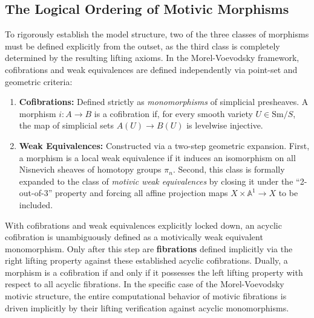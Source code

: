 \documentclass[11pt,oneside]{article}
\begin{document}
\subsection{The Logical Ordering of Motivic Morphisms}
To rigorously establish the model structure, two of the three classes of morphisms must be defined explicitly from the outset, as the third class is completely determined by the resulting lifting axioms. In the Morel-Voevodsky framework, cofibrations and weak equivalences are defined independently via point-set and geometric criteria:
\begin{enumerate}
    \item \textbf{Cofibrations:} Defined strictly as \emph{monomorphisms} of simplicial presheaves. A morphism $i: A \to B$ is a cofibration if, for every smooth variety $U \in \text{Sm}/S$, the map of simplicial sets $A(U) \to B(U)$ is levelwise injective.
    \item \textbf{Weak Equivalences:} Constructed via a two-step geometric expansion. First, a morphism is a local weak equivalence if it induces an isomorphism on all Nisnevich sheaves of homotopy groups $\pi_n$. Second, this class is formally expanded to the class of \emph{motivic weak equivalences} by closing it under the ``2-out-of-3'' property and forcing all affine projection maps $X \times \mathbb{A}^1 \to X$ to be included.
\end{enumerate}
With cofibrations and weak equivalences explicitly locked down, an acyclic cofibration is unambiguously defined as a motivically weak equivalent monomorphism. Only after this step are \textbf{fibrations} defined implicitly via the right lifting property against these established acyclic cofibrations. Dually, a morphism is a cofibration if and only if it possesses the left lifting property with respect to all acyclic fibrations. In the specific case of the Morel-Voevodsky motivic structure, the entire computational behavior of motivic fibrations is driven implicitly by their lifting verification against acyclic monomorphisms.
\end{document}

